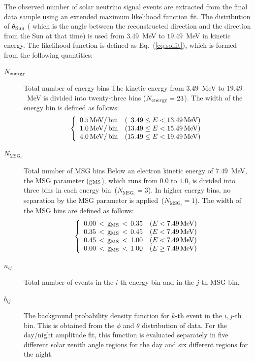 \documentclass[aps,prd,reprint,superscriptaddress,floatfix,altaffilletter,nofootinbib]{revtex4-2}
\begin{document}
The observed number of solar neutrino signal events are extracted from the final data sample
using an extended maximum likelihood function fit.
The distribution of $\theta_{\rm{Sun}}$ ( which is the angle between the reconstructed direction and the direction from the Sun at that time)
is used from $3.49$~MeV to $19.49$~MeV in kinetic energy.
The likelihood function is defined as Eq.~(\ref{eq:solfit}),
which is formed from the following quantities:
\begin{description}
\item[$N_{\rm{energy}}$]
Total number of energy bins \newline
  The kinetic energy from $3.49$~MeV to $19.49$~MeV is divided into twenty-three bins
  ($N_{\rm{energy}} = 23$). The width of the energy bin is defined as follows:  \newline
  \[
  \left\{ \begin{array}{ll}
    \rm{0.5 \, MeV /\,bin}   & (  \,\, \,3.49  \leq E  <  13.49 \, \rm{MeV}) \\
    \rm{1.0 \, MeV /\,bin}   & ( 13.49  \leq E  <  15.49 \, \rm{MeV}) \\
    \rm{4.0 \, MeV /\,bin}   & ( 15.49  \leq E  <  19.49 \, \rm{MeV})
  \end{array} \right.
  \]

\item[$N_{\mathrm{MSG}_i}$]
Total number of MSG bins \newline
Below an electron kinetic energy of $7.49$~MeV, the MSG parameter (g$_{\rm{MS}}$), which runs from $0.0$ to $1.0$, is 
divided into three bins in each energy bin~($N_{\mathrm{MSG}_i} = 3$). 
In higher energy bins, no separation by the MSG parameter is applied~($N_{\mathrm{MSG}_i} = 1$). 
The width of the MSG bins are defined as follows:  \newline
  \[
  \left\{ \begin{array}{ll}
    \rm{0.00 \, < \, {g}_{\mathrm{MS}}\, <\, 0.35} & ( E  <  7.49 \, \rm{MeV} )\\
    \rm{0.35 \, < \, {g}_{\mathrm{MS}}\, <\, 0.45} & ( E  <  7.49 \, \rm{MeV} )\\
    \rm{0.45 \, < \, {g}_{\mathrm{MS}}\, <\, 1.00} & ( E  <  7.49 \, \rm{MeV} )\\
    \rm{0.00 \, < \, {g}_{\mathrm{MS}}\, <\, 1.00} & ( E  \geq 7.49 \, \rm{MeV} )\\
  \end{array} \right.
  \]

\item[$n_{ij}$] 
Total number of events in the $i$-th energy bin and in the $j$-th MSG bin.
\item[$b_{ij}$]
The background probability density function for $k$-th event in the $i,j$-th bin.
This is obtained from the $\phi$ and $\theta$ distribution of data. For the day/night amplitude fit, this function is evaluated separately in five different solar zenith angle regions for the day and six different regions for the night.


\end{description}
\end{document}

